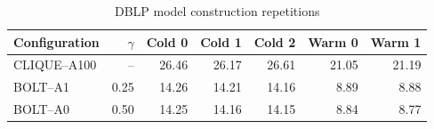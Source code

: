 \begin{table}[H]
\centering
\small
\setlength{\tabcolsep}{5pt}
\caption{DBLP model construction repetitions}
\label{tab:E_repetitions_DBLP}
\begin{tabular}{@{}lrrrrrr@{}}
\toprule
Configuration & $\gamma$ & Cold 0 & Cold 1 & Cold 2 & Warm 0 & Warm 1 \\
\midrule
CLIQUE--A100 & -- & 26.46 & 26.17 & 26.61 & 21.05 & 21.19 \\
BOLT--A1 & 0.25 & 14.26 & 14.21 & 14.16 & 8.89 & 8.88 \\
BOLT--A0 & 0.50 & 14.25 & 14.16 & 14.15 & 8.84 & 8.77 \\
\bottomrule
\end{tabular}
\end{table}
